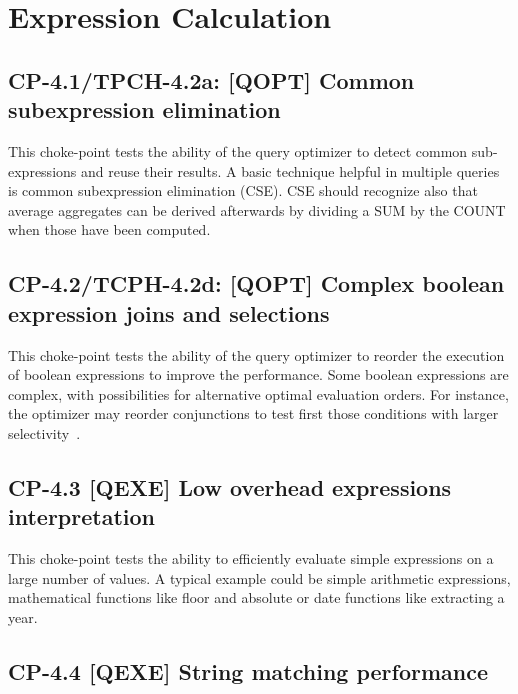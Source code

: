 %

\section{Expression Calculation}

\subsection*{CP-4.1/TPCH-4.2a: [QOPT]  Common subexpression elimination}
\label{choke_point_4.1}
This choke-point tests the ability of the query optimizer to detect common sub-expressions and reuse their results. A basic technique helpful in multiple queries is common subexpression elimination (CSE).
CSE should recognize also that average aggregates can be derived afterwards by dividing a SUM by the COUNT when those have been computed.



\subsection*{CP-4.2/TCPH-4.2d: [QOPT]  Complex boolean expression joins and selections}
\label{choke_point_4.2}
This choke-point tests the ability of the query optimizer to reorder the execution of boolean expressions to improve the performance. Some boolean expressions are complex, with possibilities for alternative optimal evaluation orders.
For instance, the optimizer may reorder conjunctions to test first those conditions with larger selectivity~\cite{DBLP:conf/vldb/Moerkotte98}.



\subsection*{CP-4.3 [QEXE] Low overhead expressions interpretation}
\label{choke_point_4.3}
This choke-point tests the ability to efficiently evaluate simple expressions on a large number of values. A typical example could be simple arithmetic expressions, mathematical functions like floor and absolute or date functions like extracting a year.



\subsection*{CP-4.4 [QEXE] String matching performance}



